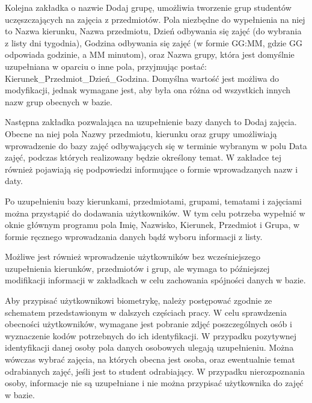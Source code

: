 \begin{figure}
\label{fig:dodajTemat}
\end{figure}

\begin{figure}
\label{fig:dodajZajecia}
\end{figure}
Kolejna zakładka o nazwie Dodaj grupę, umożliwia tworzenie grup studentów uczęszczających na zajęcia z przedmiotów. Pola niezbędne do wypełnienia na niej to Nazwa kierunku, Nazwa przedmiotu, Dzień odbywania się zajęć (do wybrania z listy dni tygodnia), Godzina odbywania się zajęć (w formie GG:MM, gdzie GG odpowiada godzinie, a MM minutom), oraz Nazwa grupy, która jest domyślnie uzupełniana w oparciu o inne pola, przyjmując postać: Kierunek_Przedmiot_Dzień_Godzina. Domyślna wartość jest możliwa do modyfikacji, jednak wymagane jest, aby była ona różna od wszystkich innych nazw grup obecnych w bazie.

Następna zakładka pozwalająca na uzupełnienie bazy danych to Dodaj zajęcia. Obecne na niej pola Nazwy przedmiotu, kierunku oraz grupy umożliwiają wprowadzenie do bazy zajęć odbywających się w terminie wybranym w polu Data zajęć, podczas których realizowany będzie określony temat. W zakładce tej również pojawiają się podpowiedzi informujące o formie wprowadzanych nazw i daty.

\begin{figure}
\label{fig:oknoGlowne}
\end{figure}

\begin{figure}
\label{fig:wybraneTabele}
\end{figure}

Po uzupełnieniu bazy kierunkami, przedmiotami, grupami, tematami i zajęciami można przystąpić do dodawania użytkowników. W tym celu potrzeba wypełnić w oknie głównym programu pola Imię, Nazwisko, Kierunek, Przedmiot i Grupa, w formie ręcznego wprowadzania danych bądź wyboru informacji z listy.

Możliwe jest również wprowadzenie użytkowników bez wcześniejszego uzupełnienia kierunków, przedmiotów i grup, ale wymaga to późniejszej modifikacji informacji w zakładkach w celu zachowania spójności danych w bazie.

Aby przypisać użytkownikowi biometrykę, należy postępować zgodnie ze schematem przedstawionym w dalszych częściach pracy.
W celu sprawdzenia obecności użytkowników, wymagane jest pobranie zdjęć poszczególnych osób i wyznaczenie kodów potrzebnych do ich identyfikacji. W przypadku pozytywnej identyfikacji danej osoby pola danych osobowych ulegają uzupełnieniu. Można wówczas wybrać zajęcia, na których obecna jest osoba, oraz ewentualnie temat odrabianych zajęć, jeśli jest to student odrabiający. W przypadku nierozpoznania osoby, informacje nie są uzupełniane i nie można przypisać użytkownika do zajęć w bazie.

